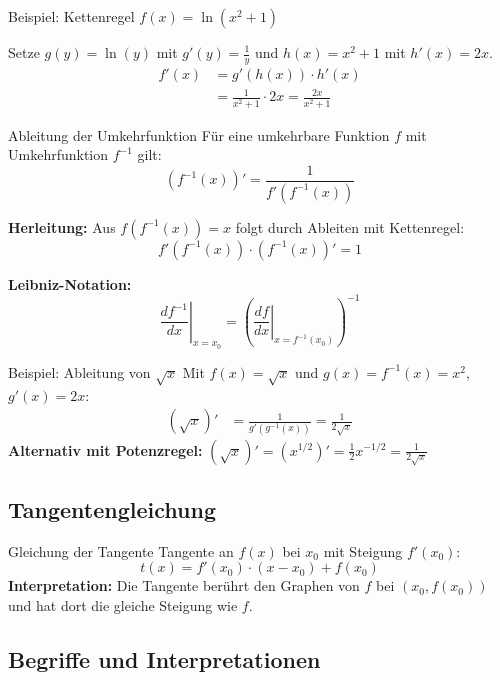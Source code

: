 \documentclass[a4paper,fontsize = 7pt]{scrartcl}
\begin{document}
\begin{subbox}{Beispiel: Kettenregel}
	$f(x) = \ln(x^2 + 1)$

	Setze $g(y) = \ln(y)$ mit $g'(y) = \frac{1}{y}$ und $h(x) = x^2 + 1$ mit $h'(x) = 2x$.
	\begin{align*}
		f'(x) &= g'(h(x)) \cdot h'(x) \\
		&= \frac{1}{x^2 + 1} \cdot 2x = \frac{2x}{x^2 + 1}
	\end{align*}
\end{subbox}

\begin{mainbox}{Ableitung der Umkehrfunktion}
Für eine umkehrbare Funktion $f$ mit Umkehrfunktion $f^{-1}$ gilt:
$$(f^{-1}(x))' = \frac{1}{f'(f^{-1}(x))}$$

\textbf{Herleitung:} Aus $f(f^{-1}(x)) = x$ folgt durch Ableiten mit Kettenregel:
$$f'(f^{-1}(x)) \cdot (f^{-1}(x))' = 1$$

\textbf{Leibniz-Notation:}
$$\left.\frac{df^{-1}}{dx}\right|_{x=x_0} = \left(\left.\frac{df}{dx}\right|_{x=f^{-1}(x_0)}\right)^{-1}$$
\end{mainbox}

\begin{subbox}{Beispiel: Ableitung von $\sqrt{x}$}
	Mit $f(x) = \sqrt{x}$ und $g(x) = f^{-1}(x) = x^2$, $g'(x) = 2x$:
	\begin{align*}
		(\sqrt{x})' &= \frac{1}{g'(g^{-1}(x))} = \frac{1}{2\sqrt{x}}
	\end{align*}
	\textbf{Alternativ mit Potenzregel:}
	$(\sqrt{x})' = (x^{1/2})' = \frac{1}{2} x^{-1/2} = \frac{1}{2\sqrt{x}}$
\end{subbox}

\subsection{Tangentengleichung}

\begin{mainbox}{Gleichung der Tangente}
	Tangente an $f(x)$ bei $x_0$ mit Steigung $f'(x_0)$:
	$$t(x) = f'(x_0) \cdot (x - x_0) + f(x_0)$$
	\textbf{Interpretation:} Die Tangente berührt den Graphen von $f$ bei $(x_0, f(x_0))$ und hat dort die gleiche Steigung wie $f$.
\end{mainbox}

\subsection{Begriffe und Interpretationen}
\end{document}
